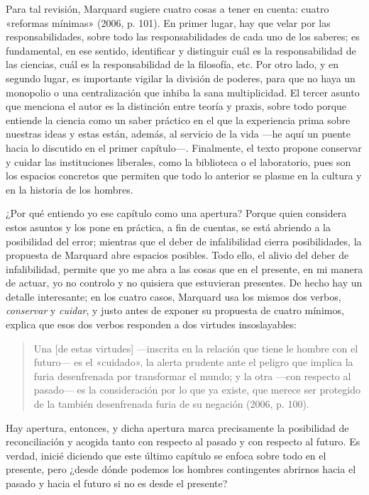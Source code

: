 \begin{refsection}
Para tal revisión, Marquard sugiere cuatro cosas a tener en cuenta: cuatro «reformas mínimas» (2006, p. 101). En primer lugar, hay que velar por las responsabilidades, sobre todo las responsabilidades de cada uno de los saberes; es fundamental, en ese sentido, identificar y distinguir cuál es la responsabilidad de las ciencias, cuál es la responsabilidad de la filosofía, etc. Por otro lado, y en segundo lugar, es importante vigilar la división de poderes, para que no haya un monopolio o una centralización que inhiba la sana multiplicidad. El tercer asunto que menciona el autor es la distinción entre teoría y praxis, sobre todo porque entiende la ciencia como un saber práctico en el que la experiencia prima sobre nuestras ideas y estas están, además, al servicio de la vida ---he aquí un puente hacia lo discutido en el primer capítulo---. Finalmente, el texto propone conservar y cuidar las instituciones liberales, como la biblioteca o el laboratorio, pues son los espacios concretos que permiten que todo lo anterior se plasme en la cultura y en la historia de los hombres.

\separador{}

¿Por qué entiendo yo ese capítulo como una apertura? Porque quien considera estos asuntos y los pone en práctica, a fin de cuentas, se está abriendo a la posibilidad del error; mientras que el deber de infalibilidad cierra posibilidades, la propuesta de Marquard abre espacios posibles. Todo ello, el alivio del deber de infalibilidad, permite que yo me abra a las cosas que en el presente, en mi manera de actuar, yo no controlo y no quisiera que estuvieran presentes. De hecho hay un detalle interesante; en los cuatro casos, Marquard usa los mismos dos verbos, \emph{conservar} y \emph{cuidar}, y justo antes de exponer su propuesta de cuatro mínimos, explica que esos dos verbos responden a dos virtudes insoslayables:

\begin{quote}
Una {[}de estas virtudes{]} ---inscrita en la relación que tiene le hombre con el futuro--- es el «cuidado», la alerta prudente ante el peligro que implica la furia desenfrenada por transformar el mundo; y la otra ---con respecto al pasado--- es la consideración por lo que ya existe, que merece ser protegido de la también desenfrenada furia de su negación (2006, p. 100).
\end{quote}

Hay apertura, entonces, y dicha apertura marca precisamente la posibilidad de reconciliación y acogida tanto con respecto al pasado y con respecto al futuro. Es verdad, inicié diciendo que este último capítulo se enfoca sobre todo en el presente, pero ¿desde dónde podemos los hombres contingentes abrirnos hacia el pasado y hacia el futuro si no es desde el presente?


\end{refsection}
